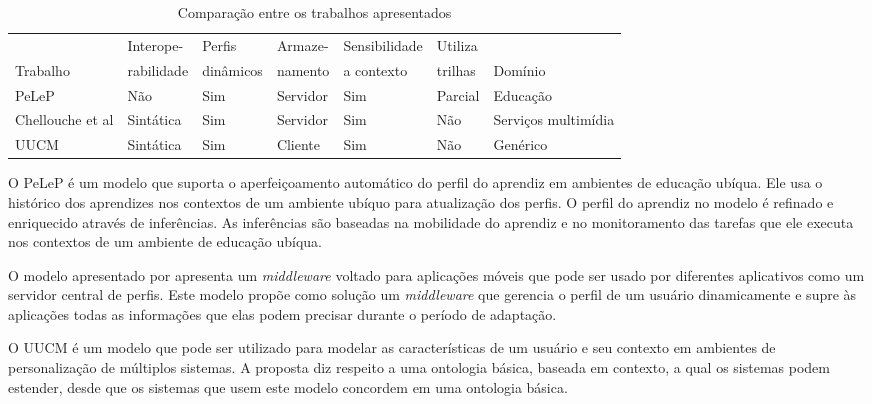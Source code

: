\begin{table}\centering\footnotesize
  \begin{tabular*}{1\textwidth}{@{}lllllll@{}}
    \toprule
                                         & Interope-  & Perfis    & Armaze-  & Sensibilidade & Utiliza & \\
    Trabalho                             & rabilidade & dinâmicos & namento  & a contexto    & trilhas & Domínio \\
    \midrule
    PeLeP                                & Não        & Sim       & Servidor & Sim           & Parcial & Educação \\
    Chellouche et al                     & Sintática  & Sim       & Servidor & Sim           & Não     & Serviços multimídia \\
    UUCM                                 & Sintática  & Sim       & Cliente  & Sim           & Não     & Genérico \\
    \bottomrule
  \end{tabular*}
  \caption{Comparação entre os trabalhos apresentados}
  \label{tab:comparacao}
\end{table}

O PeLeP \cite{pelep} é um modelo que suporta o aperfeiçoamento automático do perfil do aprendiz em ambientes de educação ubíqua. Ele usa o histórico dos aprendizes nos contextos de um ambiente ubíquo para atualização dos perfis. O perfil do aprendiz no modelo é refinado e enriquecido através de inferências. As inferências são baseadas na mobilidade do aprendiz e no monitoramento das tarefas que ele executa nos contextos de um ambiente de educação ubíqua.

O modelo apresentado por  apresenta um \emph{middleware} voltado para aplicações móveis que pode ser usado por diferentes aplicativos como um servidor central de perfis. Este modelo propõe como solução um \emph{middleware} que gerencia o perfil de um usuário dinamicamente e supre às aplicações todas as informações que elas podem precisar durante o período de adaptação.

O UUCM \cite{niederee04} é um modelo que pode ser utilizado para modelar as características de um usuário e seu contexto em ambientes de personalização de múltiplos sistemas. A proposta diz respeito a uma ontologia básica, baseada em contexto, a qual os sistemas podem estender, desde que os sistemas que usem este modelo concordem em uma ontologia básica.


